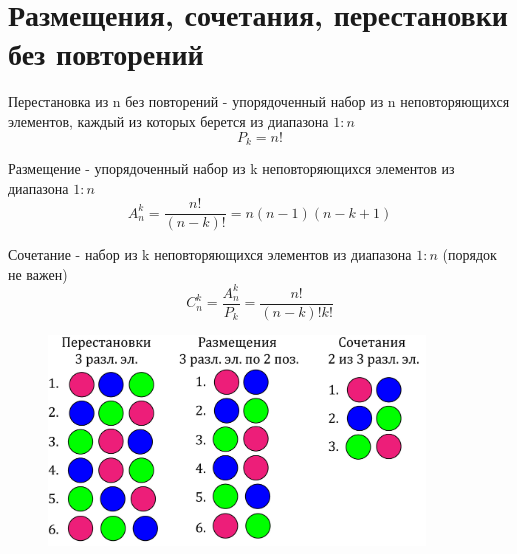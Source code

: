 \documentclass[discrete.tex]{subfiles}
\begin{document}
\section{Размещения, сочетания, перестановки без повторений}
\begin{definition}
  Перестановка из n без повторений - упорядоченный набор из n неповторяющихся элементов, каждый из которых берется из диапазона $1:n$
  \[P_k = n!\]
\end{definition}

\begin{definition}
  Размещение - упорядоченный набор из k неповторяющихся элементов из диапазона $1:n$
  \[A_n^k = \dfrac{n!}{(n-k)!} = n (n-1)(n-k+1)\]
\end{definition}

\begin{definition}
  Сочетание - набор из k неповторяющихся элементов из диапазона $1:n$ (порядок не важен)
  \[C_n^k = \frac{A_n^k}{P_k} = \dfrac{n!}{(n-k)! k!}\]
\end{definition}

\begin{figure}[H]
    \includegraphics[width=10cm]{pics/5_1.png}
    \centering
\end{figure}
\end{document}
